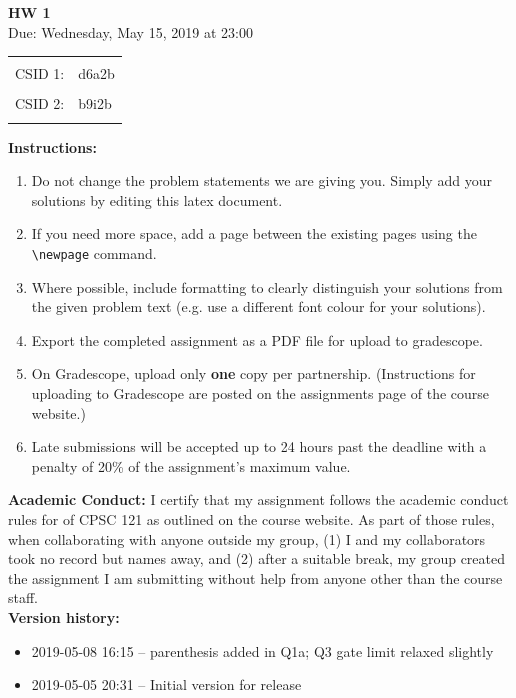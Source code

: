 \documentclass[a4paper, 20pt]{article}
\begin{document}

\begin{center}
    \LARGE
    \textbf{HW 1}
    \\[1ex]
    \Large Due: Wednesday, May 15, 2019 at 23:00 \\
\end{center}
    \LARGE
\begin{tabular}{rl}
 & \\
CSID 1: & d6a2b\\
 & \\
CSID 2: & b9i2b\\
 & \\
\end{tabular}
\large

\textbf{Instructions:}
\begin{enumerate}
\item Do not change the problem statements we are giving you. Simply add your solutions by editing this latex document. 
\item If you need more space, add a page between the existing pages using the \texttt{\textbackslash newpage} command.
\item Where possible, include formatting to clearly distinguish your solutions from the given problem text (e.g. use a different font colour for your solutions).
\item Export the completed assignment as a PDF file for upload to gradescope.
\item On Gradescope, upload only \textbf{one} copy per partnership. (Instructions for uploading to Gradescope are posted on the assignments page of the course website.)
\item Late submissions will be accepted up to 24 hours past the deadline with a penalty of 20\% of the assignment's maximum value.
\end{enumerate}

\textbf{Academic Conduct:} 
I certify that my assignment follows the academic conduct rules for of CPSC 121 as outlined on the course website. As part of those rules, when collaborating with anyone outside my group, (1) I and my collaborators took no record but names away, and (2) after a suitable break, my group created the assignment I am submitting without help from anyone other than the course staff. \\

\textbf{Version history:}
\begin{itemize}
    \item 2019-05-08 16:15 -- parenthesis added in Q1a; Q3 gate limit relaxed slightly
    \item 2019-05-05 20:31 -- Initial version for release
\end{itemize}
\end{document}
